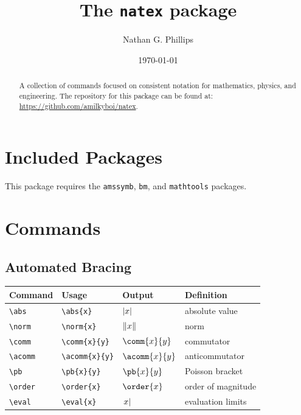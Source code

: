 \documentclass[11pt]{article}
\title{The \texttt{natex} package}
\author{Nathan G. Phillips}
\date{\today}
\begin{document}
\maketitle

\begin{abstract}
    A collection of commands focused on consistent notation for mathematics, physics, and engineering. The repository for this package can be found at: \url{https://github.com/amilkyboi/natex}.
\end{abstract}

\tableofcontents

\newpage
\section{Included Packages}

This package requires the \verb|amssymb|, \verb|bm|, and \verb|mathtools| packages.

\newpage
\section{Commands}

\subsection{Automated Bracing}

\begin{tabular}{llll}
    Command       & Usage                 & Output           & Definition         \\
    \hline
    \verb|\abs|   & \verb|\abs{x}|        & $\lvert x\rvert$        & absolute value     \\
    \verb|\norm|  & \verb|\norm{x}|       & $\lVert x\rVert$       & norm               \\
    \verb|\comm|  & \verb|\comm{x}{y}|    & $\comm{x}{y}$    & commutator         \\
    \verb|\acomm| & \verb|\acomm{x}{y}|   & $\acomm{x}{y}$   & anticommutator     \\
    \verb|\pb|    & \verb|\pb{x}{y}|      & $\pb{x}{y}$      & Poisson bracket    \\
    \verb|\order| & \verb|\order{x}|      & $\order{x}$      & order of magnitude \\
    \verb|\eval|  & \verb|\eval{x}|       & $\left.x\right\rvert$       & evaluation limits  \\
\end{tabular}
\end{document}
